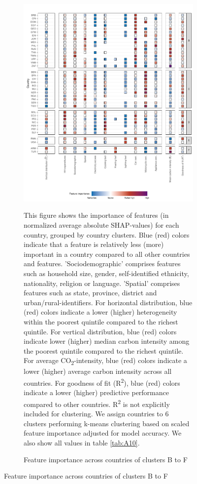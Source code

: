 \documentclass[12pt, a4paper]{article}
\newenvironment{subcaption2}
{\strut
\vspace{-5pt}
\begin{minipage}[b]{0.95\textwidth}
  \hspace*{-\parindent}
  \footnotesize}
 {\end{minipage}}
\begin{document}
\clearpage

\clearpage
\begin{figure}[ht!]\ContinuedFloat
    \centering
    \begin{subfigure}[b]{\textwidth}
    \centering
    \caption{Feature importance across countries of clusters B to F}\label{fig:fig_4_2}
    \includegraphics{Figure 4/Figure_4_Corrected_2}
    \begin{subcaption2}
    This figure shows the importance of features (in normalized average absolute SHAP-values) for each country, grouped by country clusters. Blue (red) colors indicate that a feature is relatively less (more) important in a country compared to all other countries and features. 'Sociodemographic' comprises features such as household size, gender, self-identified ethnicity, nationality, religion or language. 'Spatial' comprises features such as state, province, district and urban/rural-identifiers. For horizontal distribution, blue (red) colors indicate a lower (higher) heterogeneity within the poorest quintile compared to the richest quintile. For vertical distribution, blue (red) colors indicate lower (higher) median carbon intensity among the poorest quintile compared to the richest quintile. For average CO\textsubscript{2}-intensity, blue (red) colors indicate a lower (higher) average carbon intensity across all countries. For goodness of fit (R\textsuperscript{2}), blue (red) colors indicate a lower (higher) predictive performance compared to other countries. R\textsuperscript{2} is not explicitly included for clustering.
    We assign countries to 6 clusters performing k-means clustering based on scaled feature importance adjusted for model accuracy. We also show all values in table \ref{tab:A10}.
    \end{subcaption2}
    \end{subfigure}
    

\end{figure}
\end{document}

